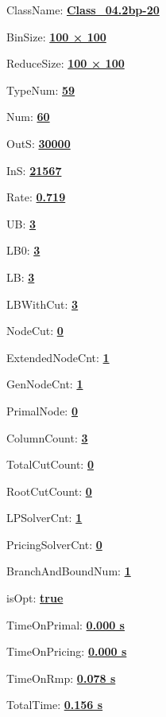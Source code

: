 \documentclass[11pt]{article}
\begin{document}
\pagestyle{empty}


ClassName: \underline{\textbf{Class_04.2bp-20}}
\par
BinSize: \underline{\textbf{100 × 100}}
\par
ReduceSize: \underline{\textbf{100 × 100}}
\par
TypeNum: \underline{\textbf{59}}
\par
Num: \underline{\textbf{60}}
\par
OutS: \underline{\textbf{30000}}
\par
InS: \underline{\textbf{21567}}
\par
Rate: \underline{\textbf{0.719}}
\par
UB: \underline{\textbf{3}}
\par
LB0: \underline{\textbf{3}}
\par
LB: \underline{\textbf{3}}
\par
LBWithCut: \underline{\textbf{3}}
\par
NodeCut: \underline{\textbf{0}}
\par
ExtendedNodeCnt: \underline{\textbf{1}}
\par
GenNodeCnt: \underline{\textbf{1}}
\par
PrimalNode: \underline{\textbf{0}}
\par
ColumnCount: \underline{\textbf{3}}
\par
TotalCutCount: \underline{\textbf{0}}
\par
RootCutCount: \underline{\textbf{0}}
\par
LPSolverCnt: \underline{\textbf{1}}
\par
PricingSolverCnt: \underline{\textbf{0}}
\par
BranchAndBoundNum: \underline{\textbf{1}}
\par
isOpt: \underline{\textbf{true}}
\par
TimeOnPrimal: \underline{\textbf{0.000 s}}
\par
TimeOnPricing: \underline{\textbf{0.000 s}}
\par
TimeOnRmp: \underline{\textbf{0.078 s}}
\par
TotalTime: \underline{\textbf{0.156 s}}
\par
\newpage
\end{document}
